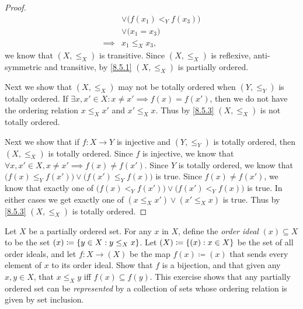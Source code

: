 \begin{proof}
\begin{align*}
             & \lor \big(f(x_1) <_Y f(x_3)\big)                                                                                                    \\
             & \lor \big(x_1 = x_3\big)                                                                                                            \\
    \implies & x_1 \leq_X x_3,
  \end{align*}
  we know that \((X, \leq_X)\) is transitive.
  Since \((X, \leq_X)\) is reflexive, anti-symmetric and transitive, by \cref{8.5.1} \((X, \leq_X)\) is partially ordered.

  Next we show that \((X, \leq_X)\) may not be totally ordered when \((Y, \leq_Y)\) is totally ordered.
  If \(\exists x, x' \in X : x \neq x' \implies f(x) = f(x')\), then we do not have the ordering relation \(x \leq_X x'\) and \(x' \leq_X x\).
  Thus by \cref{8.5.3} \((X, \leq_X)\) is not totally ordered.

  Next we show that if \(f : X \to Y\) is injective and \((Y, \leq_Y)\) is totally ordered, then \((X, \leq_X)\) is totally ordered.
  Since \(f\) is injective, we know that \(\forall x, x' \in X, x \neq x' \implies f(x) \neq f(x')\).
  Since \(Y\) is totally ordered, we know that \(\big(f(x) \leq_Y f(x')\big) \lor \big(f(x') \leq_Y f(x)\big)\) is true.
  Since \(f(x) \neq f(x')\), we know that exactly one of \(\big(f(x) <_Y f(x')\big) \lor \big(f(x') <_Y f(x)\big)\) is true.
  In either cases we get exactly one of \((x \leq_X x') \lor (x' \leq_X x)\) is true.
  Thus by \cref{8.5.3} \((X, \leq_X)\) is totally ordered.
\end{proof}

\begin{ex}\label{ex:8.5.6}
  Let \(X\) be a partially ordered set.
  For any \(x\) in \(X\), define the \emph{order ideal} \((x) \subseteq X\) to be the set \((x) \coloneqq \left\lbrace y \in X : y \leq_X x\right\rbrace\).
  Let \((X) \coloneqq \left\lbrace(x) : x \in X\right\rbrace\) be the set of all order ideals, and let \(f : X \to (X)\) be the map \(f(x) \coloneqq (x)\) that sends every element of \(x\) to its order ideal.
  Show that \(f\) is a bijection, and that given any \(x, y \in X\), that \(x \leq_X y\) iff \(f(x) \subseteq f(y)\).
  This exercise shows that any partially ordered set can be \emph{represented} by a collection of sets whose ordering relation is given by set inclusion.
\end{ex}

